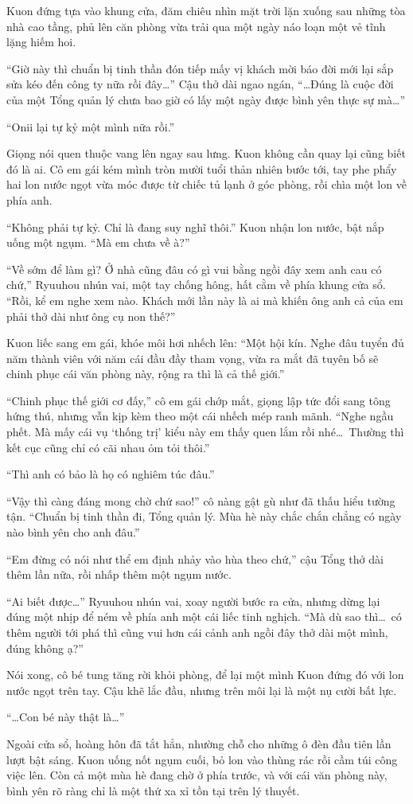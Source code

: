 \documentclass[../main.tex]{subfiles}
\begin{document}
Kuon đứng tựa vào khung cửa, đăm chiêu nhìn mặt trời lặn xuống sau những tòa nhà cao tầng, phủ lên căn phòng vừa trải qua một ngày náo loạn một vẻ tĩnh lặng hiếm hoi.

``Giờ này thì chuẩn bị tinh thần đón tiếp mấy vị khách mời báo đời mới lại sắp sửa kéo đến công ty nữa rồi đây\dots'' Cậu thở dài ngao ngán, ``\dots Đúng là cuộc đời của một Tổng quản lý chưa bao giờ có lấy một ngày được bình yên thực sự mà\dots''

``Onii lại tự kỷ một mình nữa rồi.''

Giọng nói quen thuộc vang lên ngay sau lưng. Kuon không cần quay lại cũng biết đó là ai. Cô em gái kém mình tròn mười tuổi thản nhiên bước tới, tay phe phẩy hai lon nước ngọt vừa móc được từ chiếc tủ lạnh ở góc phòng, rồi chìa một lon về phía anh.

``Không phải tự kỷ. Chỉ là đang suy nghĩ thôi.'' Kuon nhận lon nước, bật nắp uống một ngụm. ``Mà em chưa về à?''

``Về sớm để làm gì? Ở nhà cũng đâu có gì vui bằng ngồi đây xem anh cau có chứ,'' Ryuuhou nhún vai, một tay chống hông, hất cằm về phía khung cửa sổ. ``Rồi, kể em nghe xem nào. Khách mới lần này là ai mà khiến ông anh cả của em phải thở dài như ông cụ non thế?''

Kuon liếc sang em gái, khóe môi hơi nhếch lên: ``Một hội kín. Nghe đâu tuyển đủ năm thành viên với năm cái đầu đầy tham vọng, vừa ra mắt đã tuyên bố sẽ chinh phục cái văn phòng này, rộng ra thì là cả thế giới.''

``Chinh phục thế giới cơ đấy,'' cô em gái chớp mắt, giọng lập tức đổi sang tông hứng thú, nhưng vẫn kịp kèm theo một cái nhếch mép ranh mãnh. ``Nghe ngầu phết. Mà mấy cái vụ `thống trị' kiểu này em thấy quen lắm rồi nhé\dots\ Thường thì kết cục cũng chỉ có cãi nhau ỏm tỏi thôi.''

``Thì anh có bảo là họ có nghiêm túc đâu.''

``Vậy thì càng đáng mong chờ chứ sao!'' cô nàng gật gù như đã thấu hiểu tường tận. ``Chuẩn bị tinh thần đi, Tổng quản lý. Mùa hè này chắc chắn chẳng có ngày nào bình yên cho anh đâu.''

``Em đừng có nói như thể em định nhảy vào hùa theo chứ,'' cậu Tổng thở dài thêm lần nữa, rồi nhấp thêm một ngụm nước.

``Ai biết được\dots'' Ryuuhou nhún vai, xoay người bước ra cửa, nhưng dừng lại đúng một nhịp để ném về phía anh một cái liếc tinh nghịch. ``Mà dù sao thì\dots\ có thêm người tới phá thì cũng vui hơn cái cảnh anh ngồi đây thở dài một mình, đúng không ạ?''

Nói xong, cô bé tung tăng rời khỏi phòng, để lại một mình Kuon đứng đó với lon nước ngọt trên tay. Cậu khẽ lắc đầu, nhưng trên môi lại là một nụ cười bất lực.

``\dots Con bé này thật là\dots''

Ngoài cửa sổ, hoàng hôn đã tắt hẳn, nhường chỗ cho những ô đèn đầu tiên lần lượt bật sáng. Kuon uống nốt ngụm cuối, bỏ lon vào thùng rác rồi cầm túi công việc lên. Còn cả một mùa hè đang chờ ở phía trước, và với cái văn phòng này, bình yên rõ ràng chỉ là một thứ xa xỉ tồn tại trên lý thuyết.
\end{document}
